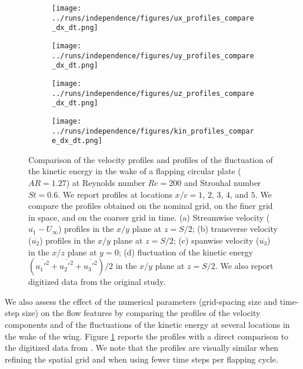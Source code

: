 \begin{figure}
  \centering
  \begin{subfigure}[c]{0.45\textwidth}
    \centering
    \texttt{[image: ../runs/independence/figures/ux\_profiles\_compare\_dx\_dt.png]}
    \caption{}
  \end{subfigure}
  \hfill
  \begin{subfigure}[c]{0.45\textwidth}
    \centering
    \texttt{[image: ../runs/independence/figures/uy\_profiles\_compare\_dx\_dt.png]}
    \caption{}
  \end{subfigure}
  \vspace{1cm}
  \begin{subfigure}[c]{0.45\textwidth}
    \centering
    \texttt{[image: ../runs/independence/figures/uz\_profiles\_compare\_dx\_dt.png]}
    \caption{}
  \end{subfigure}
  \hfill
  \begin{subfigure}[c]{0.45\textwidth}
    \centering
    \texttt{[image: ../runs/independence/figures/kin\_profiles\_compare\_dx\_dt.png]}
    \caption{}
  \end{subfigure}
  \caption{Comparison of the velocity profiles and profiles of the fluctuation of the kinetic energy in the wake of a flapping circular plate ($AR = 1.27$) at Reynolds number $Re = 200$ and Strouhal number $St = 0.6$. We report profiles at locations $x / c = 1$, $2$, $3$, $4$, and $5$. We compare the profiles obtained on the nominal grid, on the finer grid in space, and on the coarser grid in time. (a) Streamwise velocity ($\overline{u_1} - U_\infty$) profiles in the $x/y$ plane at $z = S / 2$; (b) transverse velocity ($\overline{u_2}$) profiles in the $x/y$ plane at $z = S / 2$; (c) spanwise velocity ($\overline{u_3}$) in the $x/z$ plane at $y = 0$; (d) fluctuation of the kinetic energy $( \overline{{u_1'}^2} + \overline{{u_2'}^2} + \overline{{u_3'}^2} ) / 2$ in the $x/y$ plane at $z = S / 2$. We also report digitized data from the original study.\supercite{li_dong_2016}}
  \label{fig:independence_profiles}
\end{figure}

We also assess the effect of the numerical parameters (grid-spacing size and time-step size) on the flow features by comparing the profiles of the velocity components and of the fluctuations of the kinetic energy at several locations in the wake of the wing.
Figure \ref{fig:independence_profiles} reports the profiles with a direct comparison to the digitized data from \citet{li_dong_2016}.
We note that the profiles are visually similar when refining the spatial grid and when using fewer time steps per flapping cycle.

